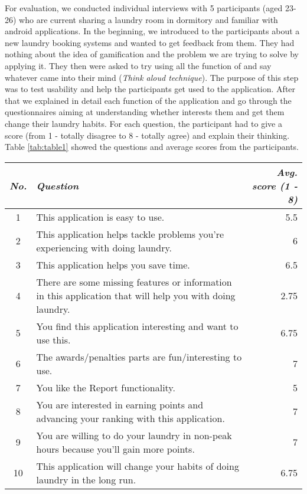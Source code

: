 For evaluation, we conducted individual interviews with 5 participants (aged 23-26) who are current sharing a laundry room in dormitory and familiar with android applications. In the beginning, we introduced to the participants about a new laundry booking systems and wanted to get feedback from them. They had nothing about the idea of gamification and the problem we are trying to solve by applying it. They then were asked to try using all the function of {\toolname} and say whatever came into their mind (\emph{Think aloud technique}). The purpose of this step was to test usability and help the participants get used to the application. After that we explained in detail each function of the application and go through the questionnaires aiming at understanding whether {\toolname} interests them and get them change their laundry habits. For each question, the participant had to give a score (from 1 - totally disagree to 8 - totally agree) and explain their thinking. Table \ref{tab:table1} showed the questions and average scores from the participants.
\begin{table*}
  \centering
  \begin{tabular}{c|l|r}
     {\textit{No.}} &{\textit{Question}} & {\textit{Avg. score (1 - 8)}} \\
    \midrule
    1&This application is easy to use. & 5.5 \\
    2&This application helps tackle problems you’re experiencing with doing laundry. & 6 \\
    3&This application helps you save time. & 6.5\\
    4&There are some missing features or information in this application that will help you with doing laundry. & 2.75 \\
    \midrule
		5&You find this application interesting and want to use this. & 6.75\\
		6&The awards/penalties parts are fun/interesting to use. & 7\\
		7&You like the Report functionality. & 5\\
		8&You are interested in earning points and advancing your ranking with this application. & 7\\
		\midrule
		9&You are willing to do your laundry in non-peak hours because you'll gain more points. & 7\\
		10&This application will change your habits of doing laundry in the long run. & 6.75
  \end{tabular}
  \caption{Questions and average score from the participants.}~\label{tab:table1}
\end{table*}

